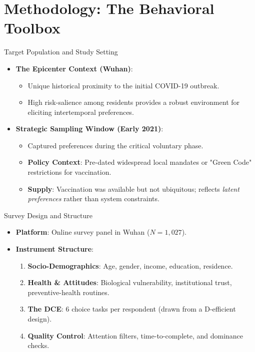 \documentclass[10pt]{beamer}
\begin{document}
\section{Methodology: The Behavioral Toolbox}

\begin{frame}{Target Population and Study Setting}
    \begin{itemize}
        \item \textbf{The Epicenter Context (Wuhan)}:
        \begin{itemize}
            \item Unique historical proximity to the initial COVID-19 outbreak.
            \item High \alert{risk-salience} among residents provides a robust environment for eliciting intertemporal preferences.
        \end{itemize}
        \item \textbf{Strategic Sampling Window (Early 2021)}:
        \begin{itemize}
            \item Captured preferences during the critical \alert{voluntary phase}.
            \item \textbf{Policy Context}: Pre-dated widespread local mandates or "Green Code" restrictions for vaccination.
            \item \textbf{Supply}: Vaccination was available but not ubiquitous; reflects \textit{latent preferences} rather than system constraints.
        \end{itemize}
    \end{itemize}
\end{frame}

\begin{frame}{Survey Design and Structure}
    \begin{itemize}
        \item \textbf{Platform}: Online survey panel in Wuhan ($N=1,027$).
        \item \textbf{Instrument Structure}:
        \begin{enumerate}
            \item \textbf{Socio-Demographics}: Age, gender, income, education, residence.
            \item \textbf{Health \& Attitudes}: Biological vulnerability, institutional trust, preventive-health routines.
            \item \textbf{The DCE}: 6 choice tasks per respondent (drawn from a D-efficient design).
            \item \textbf{Quality Control}: Attention filters, time-to-complete, and dominance checks.
        \end{enumerate}
    \end{itemize}
\end{frame}
\end{document}

